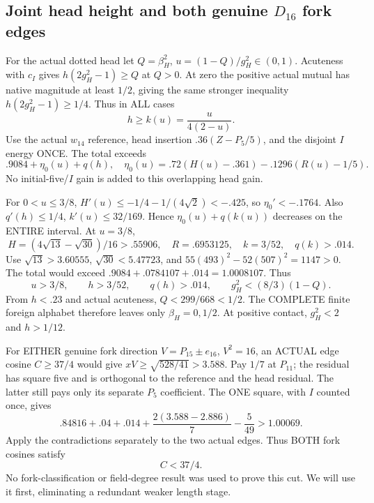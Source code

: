 \documentclass[11pt]{article}
\begin{document}
\subsection[Joint head height and both genuine D16 fork edges]{Joint head height and both genuine \(D_{16}\) fork edges}
\label{app:arithD16Ijointforkcut}

For the actual dotted head let
\(Q=\beta_H^2\), \(u=(1-Q)/g_H^2\in(0,1)\).
Acuteness with \(c_I\) gives
\(h(2g_H^2-1)\ge Q\) at \(Q>0\).
At zero the positive actual mutual
has native magnitude at least \(1/2\),
giving the same stronger inequality
\(h(2g_H^2-1)\ge1/4\).
Thus in ALL cases
\[
                         h\ge k(u)={\frac{u}{4(2-u)}} .
\]
Use the actual \(w_{14}\) reference,
head insertion \(.36(Z-P_5/5)\), and
the disjoint \(I\) energy ONCE.
The total exceeds
\[
 .9084+\eta_0(u)+q(h),\quad
 \eta_0(u)=.72(H(u)-.361)-.1296(R(u)-1/5).
\]
No initial-five/\(I\) gain is added
to this overlapping head gain.

For \(0<u\le3/8\),
\(H'(u)\le-1/4-1/(4\sqrt2)<-.425\),
so \(\eta_0'<-.1764\).
Also \(q'(h)\le1/4\),
\(k'(u)\le32/169\).
Hence \(\eta_0(u)+q(k(u))\) decreases
on the ENTIRE interval.
At \(u=3/8\),
\[
 H=(4\sqrt{13}-\sqrt{30})/16>.55906,\quad
 R=.6953125,\quad k=3/52,\quad q(k)>.014 .
\]
Use \(\sqrt{13}>3.60555\),
\(\sqrt{30}<5.47723\), and
\(55(493)^2-52(507)^2=1147>0\).
The total would exceed
\(.9084+.0784107+.014=1.0008107\).
Thus
\[
 u>3/8,\qquad h>3/52,\qquad q(h)>.014,\qquad
                              g_H^2<(8/3)(1-Q).
\tag{D16Iu}\label{eq:arithD16Ijointbounds}
\]
From \(h<.23\) and actual acuteness,
\(Q<299/668<1/2\).
The COMPLETE finite foreign alphabet
therefore leaves only
\(\beta_H=0,1/2\).
At positive contact,
\(g_H^2<2\) and \(h>1/12\).

For EITHER genuine fork direction
\(V=P_{15}\pm e_{16}\), \(V^2=16\),
an ACTUAL edge cosine \(C\ge37/4\)
would give
\(xV\ge\sqrt{528/41}>3.588\).
Pay \(1/7\) at \(P_{11}\); the residual
has square five and is orthogonal
to the reference and the head residual.
The latter still pays only its separate
\(P_5\) coefficient.
The ONE square, with \(I\) counted once,
gives
\[
                    .84816+.04+.014+
                         {\frac{2(3.588-2.886)}{7}}-{\frac{5}{49}}>1.00069 .
\]
Apply the contradictions separately to
the two actual edges.
Thus BOTH fork cosines satisfy
\[
                                      C<37/4 .
\tag{D16IC}\label{eq:arithD16Iforkcutoff}
\]
No fork-classification or field-degree
result was used to prove this cut.
We will use it first, eliminating a
redundant weaker length stage.
\end{document}
